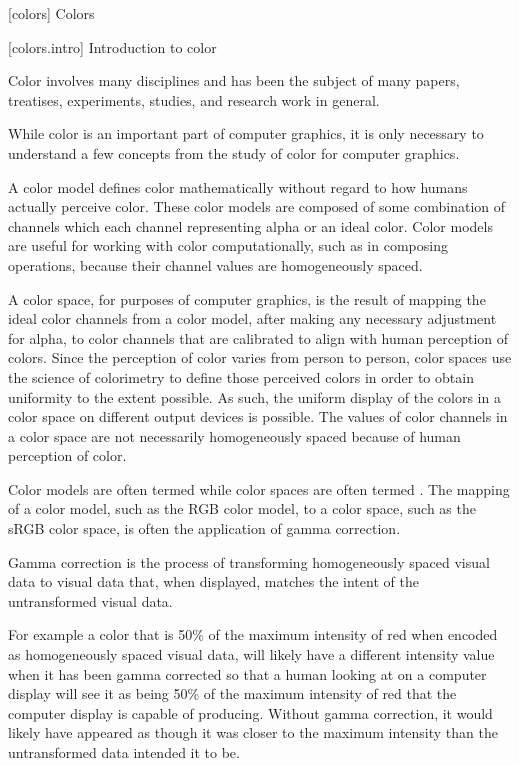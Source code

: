 
 [colors] {Colors}

 [colors.intro] {Introduction to color}

\pnum
Color involves many disciplines and has been the subject of many papers, treatises, experiments, studies, and research work in general.

\pnum
While color is an important part of computer graphics, it is only necessary to understand a few concepts from the study of color for computer graphics.

\pnum
A color model defines color mathematically without regard to how humans actually perceive color. These color models are composed of some combination of channels which each channel representing alpha or an ideal color. Color models are useful for working with color computationally, such as in composing operations, because their channel values are homogeneously spaced. 

\pnum
A color space, for purposes of computer graphics, is the result of mapping the ideal color channels from a color model, after making any necessary adjustment for alpha, to color channels that are calibrated to align with human perception of colors. Since the perception of color varies from person to person, color spaces use the science of colorimetry to define those perceived colors in order to obtain uniformity to the extent possible. As such, the uniform display of the colors in a color space on different output devices is possible. The values of color channels in a color space are not necessarily homogeneously spaced because of human perception of color.

\pnum
Color models are often termed  while color spaces are often termed . The mapping of a color model, such as the RGB color model, to a color space, such as the sRGB color space, is often the application of gamma correction.

\pnum
Gamma correction is the process of transforming homogeneously spaced visual data to visual data that, when displayed, matches the intent of the untransformed visual data.

\pnum
For example a color that is 50\% of the maximum intensity of red when encoded as homogeneously spaced visual data, will likely have a different intensity value when it has been gamma corrected so that a human looking at on a computer display will see it as being 50\% of the maximum intensity of red that the computer display is capable of producing. Without gamma correction, it would likely have appeared as though it was closer to the maximum intensity than the untransformed data intended it to be.

